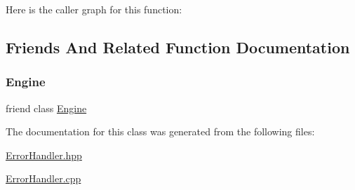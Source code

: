 Here is the caller graph for this function\+:


\subsection{Friends And Related Function Documentation}
\mbox{\label{class_saturn_1_1_g_l_error_handler_a3e1914489e4bed4f9f23cdeab34a43dc}} 
\subsubsection{\texorpdfstring{Engine}{Engine}}
{\footnotesize\ttfamily friend class \mbox{\hyperlink{class_saturn_1_1_engine}{Engine}}\hspace{0.3cm}{\ttfamily [friend]}}



The documentation for this class was generated from the following files\+:\begin{DoxyCompactItemize}
\item 
\mbox{\hyperlink{_error_handler_8hpp}{Error\+Handler.\+hpp}}\item 
\mbox{\hyperlink{_error_handler_8cpp}{Error\+Handler.\+cpp}}\end{DoxyCompactItemize}
